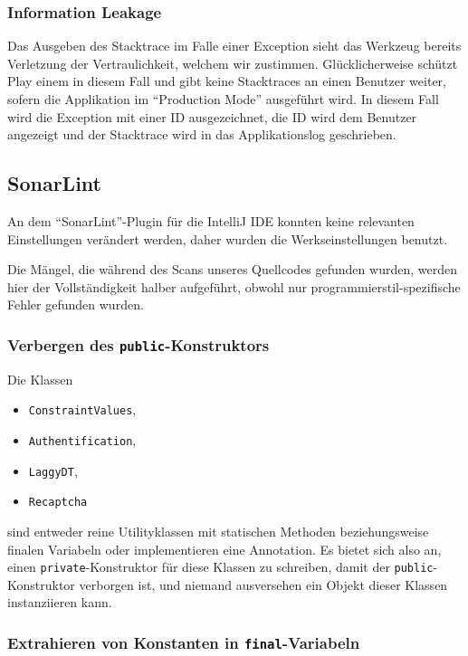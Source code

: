 \documentclass[12pt,DIV14,BCOR10mm,a4paper,twoside,parskip=half-,headsepline,headinclude,english,ngerman,bibliography=totocnumbered]{scrreprt}
\begin{document}
\subsubsection{Information Leakage}

Das Ausgeben des Stacktrace im Falle einer Exception sieht das Werkzeug bereits Verletzung der Vertraulichkeit, welchem wir zustimmen.
Glücklicherweise schützt Play einem in diesem Fall und gibt keine Stacktraces an einen Benutzer weiter, sofern die Applikation im \enquote{Production Mode} ausgeführt wird.
In diesem Fall wird die Exception mit einer ID ausgezeichnet, die ID wird dem Benutzer angezeigt und der Stacktrace wird in das Applikationslog geschrieben.

\subsection{SonarLint}

An dem \enquote{SonarLint}-Plugin für die IntelliJ IDE konnten keine relevanten Einstellungen verändert werden, daher wurden die Werkseinstellungen benutzt.

Die Mängel, die während des Scans unseres Quellcodes gefunden wurden, werden hier der Vollständigkeit halber aufgeführt, obwohl nur programmierstil-spezifische Fehler gefunden wurden.

\subsubsection{Verbergen des \texttt{public}-Konstruktors}

Die Klassen

\begin{itemize}
  \item \texttt{ConstraintValues},
  \item \texttt{Authentification},
  \item \texttt{LaggyDT},
  \item \texttt{Recaptcha}
\end{itemize}

sind entweder reine Utilityklassen mit statischen Methoden beziehungsweise finalen Variabeln oder implementieren eine Annotation.
Es bietet sich also an, einen \texttt{private}-Konstruktor für diese Klassen zu schreiben, damit der \texttt{public}-Konstruktor verborgen ist, und niemand ausversehen ein Objekt dieser Klassen instanziieren kann.

\subsubsection{Extrahieren von Konstanten in \texttt{final}-Variabeln}
\end{document}
